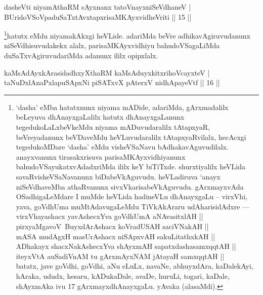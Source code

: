 
\begin{shl}
dasheVti niyamAthaRM sAyxnanx tatoV\s nayxniSeVdhaneV | \\
BUridoVSoVpaduSaTxtAvxtapxrisaMKAyxvidheVriti \hfill|| 15 || 
\end{shl}

\begin{artha}
\footnote{`dasha' eMba hatatxnunx niyama mADide, adariMda, gArxmadalilx beLeyuva dhAnayxgaLalilx hatutx dhAnayxgaLanunx tegedukoLaLxbeVkeMdu niyama mADuvudaralilx tAtapxyaR, beVreyadanunx beVDaveMdu heVLuvudaralilx tAtapxyaRvilalx, hecAcxgi tegedukoMDare `dasha' eMdu visheVSaNavu bAdhakavAguvudilalx. anayxvanunx tirasakxrisuva parisaMKAyxvidhiyanunx bahudoVSayukatxvAdadxriMda ililx keY biTiTxde. shurxtiyalilx heVLida savaRvisheVSaNavanunx biDabeVkAguvudu. heVLadiruva `anayx niSeVdhaveMba athaRvanunx sivxVkarisabeVkAguvudu. gArxmayxvAda OSadhigaLeMdare I muMde heVLida hadineVLu dhAnayxgaLu -- virxVhi, yava, goVdhUma muMtAdavugaLeMdu TiVkAkAraru udAharisidAdxre --- \\ virxVhayashacx yavAshecxYva goVdhUmA aNAvasitxlAH ||\\
pirxyaMgavoV\ BuyxdArAshacx koVradUSAH saciVNakAH ||\\
mASA mudAgxH masUrAshacx niSApxvAH sakuLitathxkAH ||\\
ADhakayx shacxNakAshecxYva shAyxmAH sapatxdashasamxqqtAH ||\\
iteyxVtA auSadiVnAM tu gArxmAyxNAM jAtayaH samxqqtAH ||\\ batatx, jave goVdhi, goVdhi, aNu eLuLx, navaNe, abhuyxdAra, kaDalekAyi, hAraka, ududx, hesaru, kADukaDale, avaDe, huruLi, togari, kaDale, shAyxmAka ivu 17 gArxmayxdhAnayxgaLu. yAvaka (alasaMdi).}hatutx eMdu niyamakAkxgi heVLide. adariMda beVre adhikavAgiruvudanunx niSeVdhisuvudakekx alalx, parisaMKAyxvidhiyu bahudoVSagaLiMda duSaTxvAgiruvudariMda adanunx ililx opipxlalx.
\end{artha}



\begin{shl}
kaMsAdAyxkArasidadhxyXthaRM kaMsAduyxkitxrihoVcayxteV | \\
taNuDxlAnaPxlapuSApxNi piSATxvX pAterxV nidhApayeVtf \hfill|| 16 || 
\end{shl}

